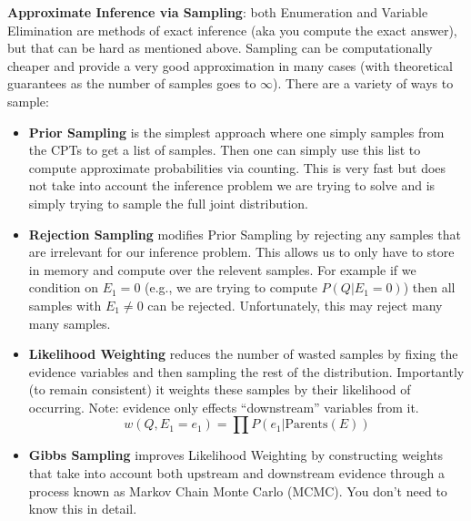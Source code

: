 \documentclass[11pt]{article}
\begin{document}
\textbf{Approximate Inference via Sampling}: both Enumeration and Variable Elimination are methods of exact inference (aka you compute the exact answer), but that can be hard as mentioned above. Sampling can be computationally cheaper and provide a very good approximation in many cases (with theoretical guarantees as the number of samples goes to $\infty$). There are a variety of ways to sample:
\begin{itemize}
    \item \textbf{Prior Sampling} is the simplest approach where one simply samples from the CPTs to get a list of samples. Then one can simply use this list to compute approximate probabilities via counting. This is very fast but does not take into account the inference problem we are trying to solve and is simply trying to sample the full joint distribution.
    \item \textbf{Rejection Sampling} modifies Prior Sampling by rejecting any samples that are irrelevant for our inference problem. This allows us to only have to store in memory and compute over the relevent samples. For example if we condition on $E_1 = 0$ (e.g., we are trying to compute $P(Q|E_1 = 0)$) then all samples with $E_1 \neq 0$ can be rejected. Unfortunately, this may reject many many samples.
    \item \textbf{Likelihood Weighting} reduces the number of wasted samples by fixing the evidence variables and then sampling the rest of the distribution. Importantly (to remain consistent) it weights these samples by their likelihood of occurring. Note: evidence only effects ``downstream'' variables from it.
    $$w(Q,E_1 = e_1) = \prod P(e_1 | \text{Parents}(E)) $$
    \item \textbf{Gibbs Sampling} improves Likelihood Weighting by constructing weights that take into account both upstream and downstream evidence through a process known as Markov Chain Monte Carlo (MCMC). You don't need to know this in detail.
\end{itemize}
\end{document}
